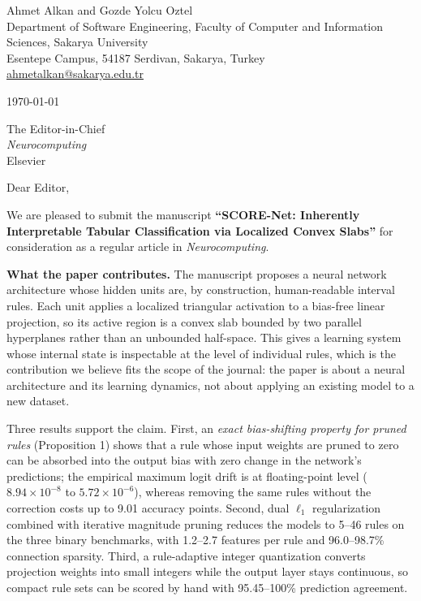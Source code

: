 \documentclass[11pt]{article}
\begin{document}
\noindent Ahmet Alkan and Gozde Yolcu Oztel\\
Department of Software Engineering, Faculty of Computer and Information
Sciences, Sakarya University\\
Esentepe Campus, 54187 Serdivan, Sakarya, Turkey\\
\href{mailto:ahmetalkan@sakarya.edu.tr}{ahmetalkan@sakarya.edu.tr}

\vspace{1.5em}
\noindent \today

\vspace{1em}
\noindent The Editor-in-Chief\\
\emph{Neurocomputing}\\
Elsevier

\vspace{1.5em}
\noindent Dear Editor,

\vspace{0.5em}
\noindent We are pleased to submit the manuscript \textbf{``SCORE-Net: Inherently
Interpretable Tabular Classification via Localized Convex Slabs''} for
consideration as a regular article in \emph{Neurocomputing}.

\noindent\textbf{What the paper contributes.} The manuscript proposes a neural
network architecture whose hidden units are, by construction, human-readable
interval rules. Each unit applies a localized triangular activation to a
bias-free linear projection, so its active region is a convex slab bounded by
two parallel hyperplanes rather than an unbounded half-space. This gives a
learning system whose internal state is inspectable at the level of individual
rules, which is the contribution we believe fits the scope of the journal: the
paper is about a neural architecture and its learning dynamics, not about
applying an existing model to a new dataset.

Three results support the claim. First, an \emph{exact bias-shifting property for pruned rules}
(Proposition 1) shows that a rule whose input weights are pruned to zero
can be absorbed into the output bias with zero change in the network's
predictions; the empirical maximum logit drift is at floating-point level
($8.94\times10^{-8}$ to $5.72\times10^{-6}$), whereas removing the same rules
without the correction costs up to 9.01 accuracy points. Second, dual $\ell_1$
regularization combined with iterative magnitude pruning reduces the models to
5--46 rules on the three binary benchmarks, with 1.2--2.7 features per rule and
96.0--98.7\% connection sparsity. Third, a rule-adaptive integer quantization
converts projection weights into small integers while the output layer stays
continuous, so compact rule sets can be scored by hand with 95.45--100\%
prediction agreement.
\end{document}
